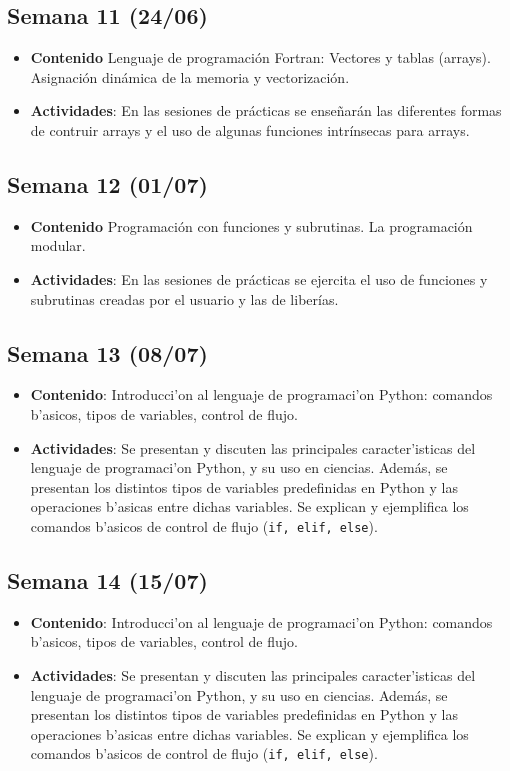 \documentclass[letterpaper,11pt]{exam}
\begin{document}
\begin{multicols}{2}
\begin{scriptsize}
\subsection*{Semana 11 (24/06)}
\begin{itemize}
\item \textbf{Contenido} Lenguaje de programación Fortran: Vectores y tablas (arrays). Asignación dinámica de la memoria y vectorización.
\item \textbf{Actividades}: En las sesiones de prácticas se enseñarán las diferentes formas de contruir arrays y el uso de algunas funciones intrínsecas para arrays.
\end{itemize}

\subsection*{Semana 12 (01/07)}
\begin{itemize}
\item \textbf{Contenido} Programación con funciones y subrutinas. La programación modular.  
\item \textbf{Actividades}: En las sesiones de prácticas se ejercita el uso de funciones y subrutinas creadas por el usuario y las de liberías.
\end{itemize}



\subsection*{Semana 13 (08/07)}
\begin{itemize}
\item \textbf{Contenido}: Introducci'on al lenguaje de programaci'on Python: comandos b'asicos, tipos de variables, control de flujo.
\item \textbf{Actividades}: Se presentan y discuten las principales caracter'isticas del lenguaje de programaci'on Python, y su uso en ciencias. Además, se presentan los distintos tipos de variables predefinidas en Python y las operaciones b'asicas entre dichas variables. Se explican y ejemplifica los comandos b'asicos de control de flujo (\texttt{if, elif, else}).
\end{itemize}

\subsection*{Semana 14 (15/07)}
\begin{itemize}
\item \textbf{Contenido}: Introducci'on al lenguaje de programaci'on Python: comandos b'asicos, tipos de variables, control de flujo.
\item \textbf{Actividades}: Se presentan y discuten las principales caracter'isticas del lenguaje de programaci'on Python, y su uso en ciencias. Además, se presentan los distintos tipos de variables predefinidas en Python y las operaciones b'asicas entre dichas variables. Se explican y ejemplifica los comandos b'asicos de control de flujo (\texttt{if, elif, else}).
\end{itemize}


\end{scriptsize}
\end{multicols}
\end{document}
